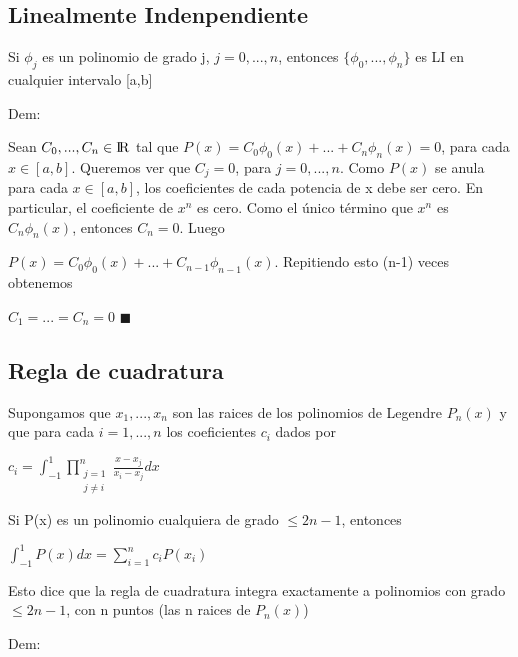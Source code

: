 \documentclass{article}
\begin{document}
\vspace{10mm}

\subsection{Linealmente Indenpendiente}\label{LI}

Si $\phi_j$ es un polinomio de grado j, $j = 0,...,n$, entonces $\{\phi_0,...,\phi_n\}$ es LI en cualquier intervalo [a,b]

\vspace{5mm}

Dem:

Sean $C_0,...,C_n \in {\rm I\!R}$ tal que $P(x) = C_0\phi_0(x)+...+C_n\phi_n(x) = 0$, para cada $x \in [a,b]$.
Queremos ver que $C_j = 0$, para $j = 0,...,n$. Como $P(x)$ se anula para cada $x \in [a,b]$, los coeficientes
de cada potencia de x debe ser cero. En particular, el coeficiente de $x^n$ es cero. Como el único término que 
$x^n$ es $C_n\phi_n(x)$, entonces $C_n = 0$. Luego

$P(x) = C_0\phi_0(x)+...+C_{n-1}\phi_{n-1}(x)$. Repitiendo esto (n-1) veces obtenemos

$C_1 = ... = C_n = 0$ $\blacksquare$




\vspace{10mm}

\subsection{Regla de cuadratura}\label{cuadratura}

Supongamos que $x_1,...,x_n$ son las raices de los polinomios de Legendre $P_n(x)$ y que para cada
$i = 1,...,n$ los coeficientes $c_i$ dados por

$c_i = \displaystyle\int_{-1}^1 \prod\limits_{\substack{j = 1\\
                  j \not= i}}^n 
                  \frac{x-x_j}{x_i-x_j}dx$

Si P(x) es un polinomio cualquiera de grado $\leq 2n-1$, entonces

$\displaystyle\int_{-1}^1P(x) dx = \sum\limits_{i=1}^n c_i P(x_i)$

Esto dice que la regla de cuadratura integra exactamente a polinomios con grado $\leq 2n-1$, con n puntos
(las n raices de $P_n(x)$)


\vspace{5mm}

Dem:
\end{document}
